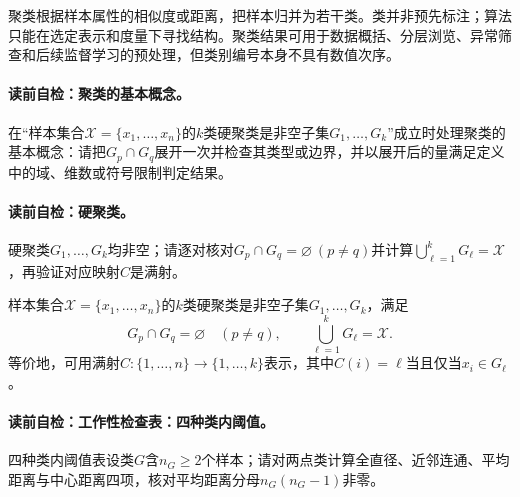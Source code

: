 \label{struct:V4-C02-CH06}
聚类根据样本属性的相似度或距离，把样本归并为若干类。类并非预先标注；算法只能在选定表示和度量下寻找结构。聚类结果可用于数据概括、分层浏览、异常筛查和后续监督学习的预处理，但类别编号本身不具有数值次序。

\paragraph{读前自检：聚类的基本概念。}在“样本集合$\mathcal X=\{x_1,\ldots,x_n\}$的$k$类硬聚类是非空子集$G_1,\ldots,G_k$”成立时处理聚类的基本概念：请把$G_p\cap G_q$展开一次并检查其类型或边界，并以展开后的量满足定义中的域、维数或符号限制判定结果。\par

\label{struct:V4-C02-CH07}
\paragraph{读前自检：硬聚类。}硬聚类$G_1,\ldots,G_k$均非空；请逐对核对$G_p\cap G_q=\varnothing\ (p\ne q)$并计算$\bigcup_{\ell=1}^kG_\ell=\mathcal X$，再验证对应映射$C$是满射。\par

\begin{definition}[硬聚类]\label{def:V4-C02-hard-clustering}
样本集合$\mathcal X=\{x_1,\ldots,x_n\}$的$k$类硬聚类是非空子集$G_1,\ldots,G_k$，满足
\[
G_p\cap G_q=\varnothing\quad(p\neq q),\qquad
\bigcup_{\ell=1}^{k}G_\ell=\mathcal X.
\]
等价地，可用满射$C:\{1,\ldots,n\}\to\{1,\ldots,k\}$表示，其中$C(i)=\ell$当且仅当$x_i\in G_\ell$。
\end{definition}

\label{def:V4-C02-cluster-thresholds}
\paragraph{读前自检：工作性检查表：四种类内阈值。}四种类内阈值表设类$G$含$n_G\ge2$个样本；请对两点类计算全直径、近邻连通、平均距离与中心距离四项，核对平均距离分母$n_G(n_G-1)$非零。\par

